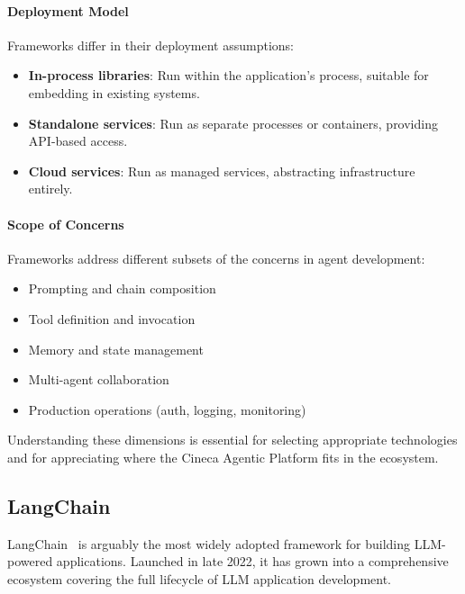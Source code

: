 \paragraph{Deployment Model}
Frameworks differ in their deployment assumptions:
\begin{itemize}
    \item \textbf{In-process libraries}: Run within the application's process, suitable for embedding in existing systems.
    \item \textbf{Standalone services}: Run as separate processes or containers, providing API-based access.
    \item \textbf{Cloud services}: Run as managed services, abstracting infrastructure entirely.
\end{itemize}

\paragraph{Scope of Concerns}
Frameworks address different subsets of the concerns in agent development:
\begin{itemize}
    \item Prompting and chain composition
    \item Tool definition and invocation
    \item Memory and state management
    \item Multi-agent collaboration
    \item Production operations (auth, logging, monitoring)
\end{itemize}

Understanding these dimensions is essential for selecting appropriate technologies and for appreciating where the Cineca Agentic Platform fits in the ecosystem.

\subsection{LangChain}

LangChain~%
is arguably the most widely adopted framework for building LLM-powered applications. Launched in late 2022, it has grown into a comprehensive ecosystem covering the full lifecycle of LLM application development.

